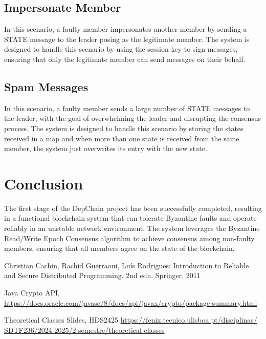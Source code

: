 \documentclass[runningheads]{llncs}
\begin{document}
\subsection{Impersonate Member}
In this scenario, a faulty member impersonates another member by sending a STATE
message to the leader posing as the legitimate member. The system is designed to
handle this scenario by using the session key to sign messages, ensuring that
only the legitimate member can send messages on their behalf.
%
\subsection{Spam Messages}
In this scenario, a faulty member sends a large number of STATE messages to the
leader, with the goal of overwhelming the leader and disrupting the consensus
process. The system is designed to handle this scenario by storing the states
received in a map and when more than one state is received from the same member,
the system just overwrites its entry with the new state.
%
\section{Conclusion}
The first stage of the DepChain project has been successfully completed,
resulting in a functional blockchain system that can tolerate Byzantine faults
and operate reliably in an unstable network environment. The system leverages
the Byzantine Read/Write Epoch Consensus algorithm to achieve consensus among
non-faulty members, ensuring that all members agree on the state of the
blockchain.

\begin{thebibliography}{8}

Christian Cachin, Rachid Guerraoui, Luís Rodrigues: Introduction to Reliable and
Secure Distributed Programming. 2nd edn. Springer, 2011

Java Crypto API,
\url{https://docs.oracle.com/javase/8/docs/api/javax/crypto/package-summary.html}

Theoretical Classes Slides, HDS2425
\url{https://fenix.tecnico.ulisboa.pt/disciplinas/ SDTF236/2024-2025/2-semestre/theoretical-classes}
\end{thebibliography}
\end{document}
